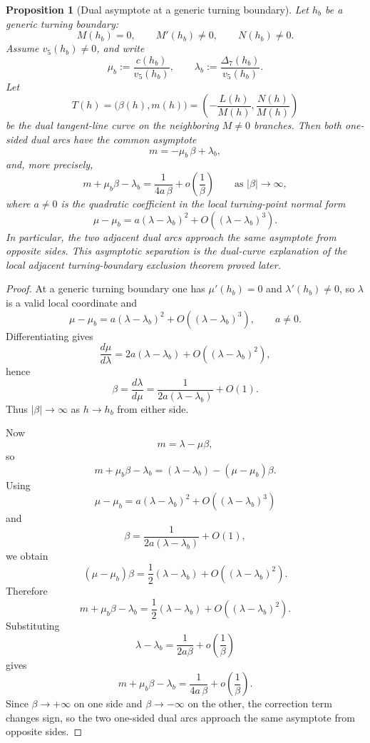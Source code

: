 \documentclass[11pt,a4paper]{amsart}
\theoremstyle{plain}
\newtheorem{proposition}[theorem]{Proposition}
\theoremstyle{definition}
\begin{document}
\begin{proposition}[Dual asymptote at a generic turning boundary]
\label{prop:dual-asymptote-turning-boundary}
Let $h_b$ be a generic turning boundary:
\[
M(h_b)=0,\qquad M'(h_b)\neq 0,\qquad N(h_b)\neq 0.
\]
Assume $v_5(h_b)\neq 0$, and write
\[
\mu_b:=\frac{c(h_b)}{v_5(h_b)},
\qquad
\lambda_b:=\frac{\Delta_7(h_b)}{v_5(h_b)}.
\]
Let
\[
T(h)=\bigl(\beta(h),m(h)\bigr)
=
\left(-\frac{L(h)}{M(h)},\frac{N(h)}{M(h)}\right)
\]
be the dual tangent-line curve on the neighboring $M\neq 0$ branches.
Then both one-sided dual arcs have the common asymptote
\[
m=-\mu_b\,\beta+\lambda_b,
\]
and, more precisely,
\[
m+\mu_b\beta-\lambda_b
=
\frac{1}{4a\,\beta}+o\!\left(\frac1\beta\right)
\qquad\text{as } |\beta|\to\infty,
\]
where $a\neq 0$ is the quadratic coefficient in the local turning-point normal
form
\[
\mu-\mu_b=a(\lambda-\lambda_b)^2+O((\lambda-\lambda_b)^3).
\]
In particular, the two adjacent dual arcs approach the same asymptote from
opposite sides. This asymptotic separation is the dual-curve explanation of
the local adjacent turning-boundary exclusion theorem proved later.
\end{proposition}

\begin{proof}
At a generic turning boundary one has $\mu'(h_b)=0$ and $\lambda'(h_b)\neq 0$,
so $\lambda$ is a valid local coordinate and
\[
\mu-\mu_b=a(\lambda-\lambda_b)^2+O((\lambda-\lambda_b)^3),
\qquad a\neq 0.
\]
Differentiating gives
\[
\frac{d\mu}{d\lambda}=2a(\lambda-\lambda_b)+O((\lambda-\lambda_b)^2),
\]
hence
\[
\beta=\frac{d\lambda}{d\mu}
=
\frac{1}{2a(\lambda-\lambda_b)}+O(1).
\]
Thus $|\beta|\to\infty$ as $h\to h_b$ from either side.

Now
\[
m=\lambda-\mu\beta,
\]
so
\[
m+\mu_b\beta-\lambda_b
=
(\lambda-\lambda_b)-(\mu-\mu_b)\beta.
\]
Using
\[
\mu-\mu_b=a(\lambda-\lambda_b)^2+O((\lambda-\lambda_b)^3)
\]
and
\[
\beta=\frac{1}{2a(\lambda-\lambda_b)}+O(1),
\]
we obtain
\[
(\mu-\mu_b)\beta
=
\frac12(\lambda-\lambda_b)+O((\lambda-\lambda_b)^2).
\]
Therefore
\[
m+\mu_b\beta-\lambda_b
=
\frac12(\lambda-\lambda_b)+O((\lambda-\lambda_b)^2).
\]
Substituting
\[
\lambda-\lambda_b=\frac{1}{2a\beta}+o\!\left(\frac1\beta\right)
\]
gives
\[
m+\mu_b\beta-\lambda_b
=
\frac{1}{4a\,\beta}+o\!\left(\frac1\beta\right).
\]
Since $\beta\to+\infty$ on one side and $\beta\to-\infty$ on the other, the
correction term changes sign, so the two one-sided dual arcs approach the same
asymptote from opposite sides.
\end{proof}
\end{document}
